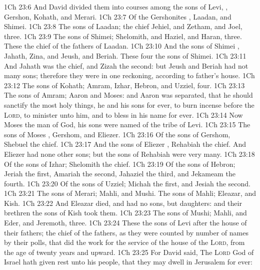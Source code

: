 \vs 1Ch 23:6 And David divided them into courses among the sons of Levi, , Gershon, Kohath, and Merari.
\vs 1Ch 23:7 Of the Gershonites , Laadan, and Shimei.
\vs 1Ch 23:8 The sons of Laadan; the chief  Jehiel, and Zetham, and Joel, three.
\vs 1Ch 23:9 The sons of Shimei; Shelomith, and Haziel, and Haran, three. These  the chief of the fathers of Laadan.
\vs 1Ch 23:10 And the sons of Shimei , Jahath, Zina, and Jeush, and Beriah. These four  the sons of Shimei.
\vs 1Ch 23:11 And Jahath was the chief, and Zizah the second: but Jeush and Beriah had not many sons; therefore they were in one reckoning, according to  father's house.
\vs 1Ch 23:12 The sons of Kohath; Amram, Izhar, Hebron, and Uzziel, four.
\vs 1Ch 23:13 The sons of Amram; Aaron and Moses: and Aaron was separated, that he should sanctify the most holy things, he and his sons for ever, to burn incense before the \textsc{Lord}, to minister unto him, and to bless in his name for ever.
\vs 1Ch 23:14 Now  Moses the man of God, his sons were named of the tribe of Levi.
\vs 1Ch 23:15 The sons of Moses , Gershom, and Eliezer.
\vs 1Ch 23:16 Of the sons of Gershom, Shebuel  the chief.
\vs 1Ch 23:17 And the sons of Eliezer , Rehabiah the chief. And Eliezer had none other sons; but the sons of Rehabiah were very many.
\vs 1Ch 23:18 Of the sons of Izhar; Shelomith the chief.
\vs 1Ch 23:19 Of the sons of Hebron; Jeriah the first, Amariah the second, Jahaziel the third, and Jekameam the fourth.
\vs 1Ch 23:20 Of the sons of Uzziel; Michah the first, and Jesiah the second.
\vs 1Ch 23:21 The sons of Merari; Mahli, and Mushi. The sons of Mahli; Eleazar, and Kish.
\vs 1Ch 23:22 And Eleazar died, and had no sons, but daughters: and their brethren the sons of Kish took them.
\vs 1Ch 23:23 The sons of Mushi; Mahli, and Eder, and Jeremoth, three.
\vs 1Ch 23:24 These  the sons of Levi after the house of their fathers;  the chief of the fathers, as they were counted by number of names by their polls, that did the work for the service of the house of the \textsc{Lord}, from the age of twenty years and upward.
\vs 1Ch 23:25 For David said, The \textsc{Lord} God of Israel hath given rest unto his people, that they may dwell in Jerusalem for ever:
